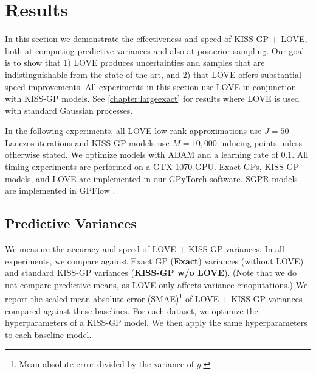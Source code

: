 \section{Results}
\label{sec:love_results}

In this section we demonstrate the effectiveness and speed of KISS-GP + LOVE{}, both at computing predictive variances and also at posterior sampling.
Our goal is to show that 1) LOVE{} produces uncertainties and samples that are indistinguishable from the state-of-the-art, and 2) that LOVE{} offers substantial speed improvements.
All experiments in this section use LOVE in conjunction with KISS-GP models.
See \cref{chapter:largeexact} for results where LOVE is used with standard Gaussian processes.

In the following experiments, all LOVE{} low-rank approximations use $J=50$ Lanczos iterations and KISS-GP models use $M\!=\!10,\!000$ inducing points unless otherwise stated.
We optimize models with ADAM \cite{kingma2014adam} and a learning rate of $0.1$.
All timing experiments are performed on a GTX 1070 GPU.
Exact GPs, KISS-GP models, and LOVE are implemented in our GPyTorch software.
SGPR models are implemented in GPFlow \cite{matthews2017gpflow}.

\subsection{Predictive Variances}
\label{sec:results_variances}

We measure the accuracy and speed of LOVE + KISS-GP{} variances.
In all experiments, we compare against Exact GP ({\bf Exact}) variances (without LOVE) and standard KISS-GP variances ({\bf KISS-GP w/o LOVE}).
(Note that we do not compare predictive means, as LOVE{} only affects variance cmoputations.)
We report the scaled mean absolute error (SMAE)\footnote{
  Mean absolute error divided by the variance of $y$.
} \cite{rasmussen2006gaussian} of LOVE{} + KISS-GP variances compared against these baselines.
For each dataset, we optimize the hyperparameters of a KISS-GP model.
We then apply the same hyperparameters to each baseline model.

